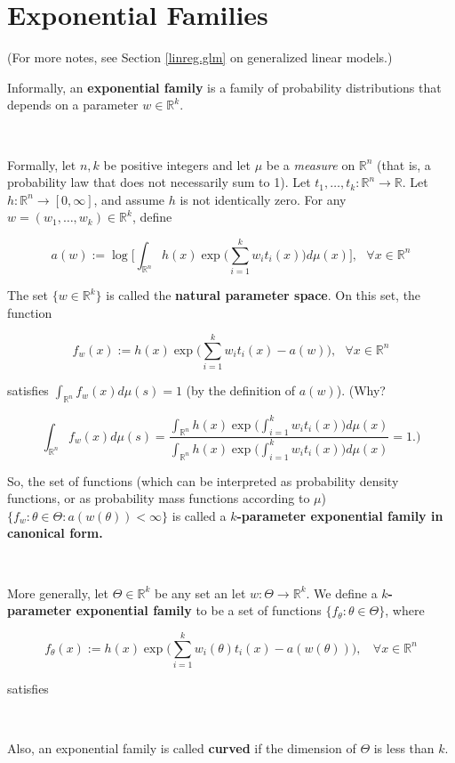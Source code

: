 \section{Exponential Families}\label{prob.sec.exp.fams}

(For more notes, see Section \ref{linreg.glm} on generalized linear models.)

\begin{definition}\label{prob.defn.exp.fams} Informally, an \textbf{exponential family} is a family of probability distributions that depends on a parameter \(w \in \mathbb{R}^k\). 

\

Formally, let \(n, k\) be positive integers and let \(\mu\) be a \textit{measure} on \(\mathbb{R}^n\) (that is, a probability law that does not necessarily sum to 1). Let \(t_1, \ldots, t_k : \mathbb{R}^n \to \mathbb{R}\). Let \(h: \mathbb{R}^n \to [0, \infty]\), and assume \(h\) is not identically zero. For any \(w = (w_1, \ldots, w_k) \in \mathbb{R}^k\), define

\[
a(w) := \log \bigg[ \int_{\mathbb{R}^n} h(x) \exp \bigg( \sum_{i=1}^k w_i t_i(x) \bigg) d \mu(x) \bigg], \ \ \ \forall x \in \mathbb{R}^n
\]

The set \(\{w \in \mathbb{R}^k\}\) is called the \textbf{natural parameter space}. On this set, the function

\[
f_w(x) := h(x) \exp \bigg( \sum_{i=1}^k w_i t_i(x) - a(w) \bigg), \ \ \ \forall x \in \mathbb{R}^n
\]

satisfies \(\int_{\mathbb{R}^n} f_w(x) d \mu(s) = 1\) (by the definition of \(a(w)\)). (Why? 

\[
 \int_{\mathbb{R}^n} f_w(x) d \mu(s) = \frac{\int_{\mathbb{R}^n} h(x)  \exp \bigg( \int_{i=1}^k w_i t_i(x) \bigg) d \mu(x) }{\int_{\mathbb{R}^n} h(x)  \exp \bigg( \int_{i=1}^k w_i t_i(x) \bigg) d \mu(x)} = 1.)
 \]
 
 So, the set of functions (which can be interpreted as probability density functions, or as probability mass functions according to \(\mu\)) \(\{f_w: \theta \in \Theta: a(w(\theta)) < \infty \}\) is called a \textbf{\(k\)-parameter exponential family in canonical form.} 
 
 \
 
 More generally, let \(\Theta \in \mathbb{R}^k\) be any set an let \(w: \Theta \to \mathbb{R}^k\). We define a \textbf{\(k\)-parameter exponential family} to be a set of functions \(\{f_{\theta}: \theta \in \Theta\}\), where
 
 \[
 f_{\theta}(x) := h(x) \exp \bigg( \sum_{i=1}^k w_i(\theta) t_i(x) - a(w(\theta))\bigg), \ \ \ \ \forall x \in \mathbb{R}^n
 \]
 
 satisfies 
 
 \
 
 Also, an exponential family is called \textbf{curved} if the dimension of \(\Theta\) is less than \(k\).

\end{definition}

